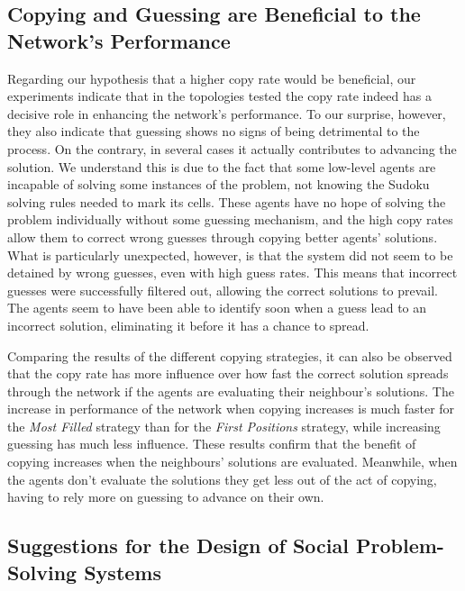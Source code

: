 \documentclass{article}
\begin{document}
\subsection{Copying and Guessing are Beneficial to the Network's Performance}

Regarding our hypothesis that a higher copy rate would be beneficial, our experiments indicate that in the topologies tested the copy rate indeed has a decisive role in enhancing the network's performance. To our surprise, however, they also indicate that guessing shows no signs of being detrimental to the process. On the contrary, in several cases it actually contributes to advancing the solution. We understand this is due to the fact that some low-level agents are incapable of solving some instances of the problem, not knowing the Sudoku solving rules needed to mark its cells. These agents have no hope of solving the problem individually without some guessing mechanism, and the high copy rates allow them to correct wrong guesses through copying better agents' solutions. What is particularly unexpected, however, is that the system did not seem to be detained by wrong guesses, even with high guess rates. This means that incorrect guesses were successfully filtered out, allowing the correct solutions to prevail. The agents seem to have been able to identify soon when a guess lead to an incorrect solution, eliminating it before it has a chance to spread.

Comparing the results of the different copying strategies, it can also be observed that the copy rate has more influence over how fast the correct solution spreads through the network if the agents are evaluating their neighbour's solutions. The increase in performance of the network when copying increases is much faster for the \emph{Most Filled} strategy than for the \emph{First Positions} strategy, while increasing guessing has much less influence. These results confirm that the benefit of copying increases when the neighbours' solutions are evaluated. Meanwhile, when the agents don't evaluate the solutions they get less out of the act of copying, having to rely more on guessing to advance on their own.

\subsection{Suggestions for the Design of Social Problem-Solving Systems}
\end{document}
